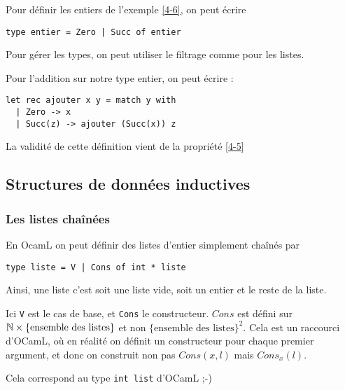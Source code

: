 \begin{example}
	Pour définir les entiers de l'exemple \ref{4-6}, on peut écrire \begin{lstlisting}
type entier = Zero | Succ of entier
	\end{lstlisting}
\end{example}

\begin{syntaxe}
	Pour gérer les types, on peut utiliser le filtrage comme pour les listes.
\end{syntaxe}

\begin{example}
	Pour l'addition sur notre type entier, on peut écrire :
	\begin{lstlisting}
let rec ajouter x y = match y with
  | Zero -> x
  | Succ(z) -> ajouter (Succ(x)) z
	\end{lstlisting}
\end{example}

\begin{example}
	La validité de cette définition vient de la propriété \ref{4-5}
\end{example}

\subsection{Structures de données inductives}

\subsubsection{Les listes chaînées}


En OcamL on peut définir des listes d'entier simplement chaînés par \begin{lstlisting}
type liste = V | Cons of int * liste
\end{lstlisting}

Ainsi, une liste c'est soit une liste vide, soit un entier et le reste de la liste.

\begin{rem}
	Ici \texttt V est le cas de base, et \texttt{Cons} le constructeur. $Cons$ est défini sur $\mathbb{N} \times \{\text{ensemble des listes}\}$ et non $\{\text{ensemble des listes}\}^2$. Cela est un raccourci d'OCamL, où en réalité on définit un constructeur pour chaque premier argument, et donc on construit non pas $Cons(x, l)$ mais $Cons_x(l)$.
\end{rem}

\begin{rem}
	Cela correspond au type \texttt{int list} d'OCamL ;-)
\end{rem}

